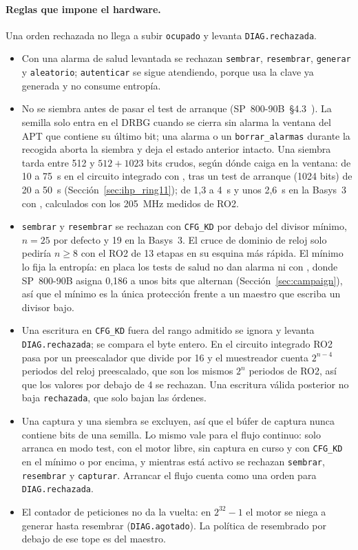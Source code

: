 \paragraph{Reglas que impone el hardware.} Una orden rechazada no llega a
subir \texttt{ocupado} y levanta \texttt{DIAG.rechazada}.
\begin{itemize}
\item Con una alarma de salud levantada se rechazan \texttt{sembrar},
  \texttt{resembrar}, \texttt{generar} y \texttt{aleatorio};
  \texttt{autenticar} se sigue atendiendo, porque usa la clave ya generada
  y no consume entropía.
\item No se siembra antes de pasar el test de arranque
  (SP~800-90B~\S4.3~\cite{turan_2018_sp80090b}). La semilla solo entra en
  el \ac{DRBG} cuando se cierra sin alarma la ventana del \ac{APT} que
  contiene su último bit; una alarma o un \texttt{borrar\_alarmas} durante
  la recogida aborta la siembra y deja el estado anterior intacto. Una
  siembra tarda entre 512 y $512 + 1023$ bits crudos, según dónde caiga
  en la ventana: de 10 a 75~s en el circuito integrado con  \est{},
  tras un test de arranque (1024 bits) de 20 a 50~s
  (Sección~\ref{sec:ihp_ring11}); de 1,3 a 4~s y unos 2,6~s en la Basys~3
  con  \est{}, calculados con los 205~MHz medidos de RO2.
\item \texttt{sembrar} y \texttt{resembrar} se rechazan con
  \texttt{CFG\_KD} por debajo del divisor mínimo, $n = 25$ por defecto y
  19 en la Basys~3. El cruce de dominio de reloj solo pediría $n \ge 8$
  con el RO2 de 13 etapas en su esquina más rápida. El mínimo lo fija la entropía: en placa los
  tests de salud no dan alarma ni con , donde SP~800-90B asigna
  0,186 a unos bits que alternan \meas{} (Sección~\ref{sec:campaign}), así
  que el mínimo es la única protección frente a un maestro que escriba un
  divisor bajo.
\item Una escritura en \texttt{CFG\_KD} fuera del rango admitido se ignora
  y levanta \texttt{DIAG.rechazada}; se compara el byte entero. En el
  circuito integrado RO2 pasa por un preescalador que divide por 16 y el
  muestreador cuenta $2^{n-4}$ periodos del reloj preescalado, que son los
  mismos $2^{n}$ periodos de RO2, así que los valores por debajo de 4 se
  rechazan. Una escritura válida posterior no baja \texttt{rechazada}, que
  solo bajan las órdenes.
\item Una captura y una siembra se excluyen, así que el búfer de captura
  nunca contiene bits de una semilla. Lo mismo vale para el flujo
  continuo: solo arranca en modo test, con el motor libre, sin captura en
  curso y con \texttt{CFG\_KD} en el mínimo o por encima, y mientras está
  activo se rechazan \texttt{sembrar}, \texttt{resembrar} y
  \texttt{capturar}. Arrancar el flujo cuenta como una orden para
  \texttt{DIAG.rechazada}.
\item El contador de peticiones no da la vuelta: en $2^{32}-1$ el motor se
  niega a generar hasta resembrar (\texttt{DIAG.agotado}). La política de
  resembrado por debajo de ese tope es del maestro.
\end{itemize}
